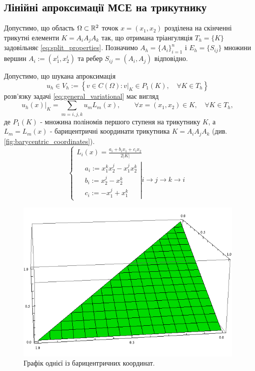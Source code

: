 \subsection{Лінійні апроксимації МСЕ на трикутнику}

Допустимо, що область $\Omega \subset \mathbb{R}^2$ точок $x = (x_1, x_2)$ розділена на скінченні трикутні елементи $K = A_iA_jA_k$
	так, що отримана тріангуляція $T_h = \lbrace K \rbrace$ задовільняє
\eqref{eq:split_properties}.
Позначимо $A_h = \lbrace A_i \rbrace_{i=1}^n$ і $E_h = \lbrace S_{ij} \rbrace$ множини вершин $A_i := (x_1^i, x_2^i)$ та ребер $S_{ij} = (A_i, A_j)$ відповідно.

Допустимо, що шукана апроксимація
\begin{equation}
	u_h \in V_h := \left\lbrace v \in C(\Omega) : v|_K \in P_1(K), \quad \forall K \in T_h \right\rbrace
\end{equation}
%
розв'язку задачі \eqref{eq:general_variational} має вигляд
%
\begin{equation}\label{eq:appr_kind}
	u_h(x)|_K = \sum \limits_{m=i,j,k} u_m L_m (x), \qquad \forall x=(x_1, x_2) \in K, \quad \forall K \in T_h,
\end{equation}
%
де $P_1(K)$ - множина поліномів першого ступеня на трикутнику $K$, а $L_m = L_m(x)$ -
	барицентричні координати трикутника $K = A_i A_j A_k$ (див. \autoref{fig:barycentric_coordinates}).
%
\begin{equation}\label{eq:barycentric_coord}
	\begin{cases}
		L_i(x) = \frac{a_i + b_i x_1 + c_i x_2}{2 |K|} \\
			\left.
			\begin{split}
				&a_i := x_1^k x_2^j - x_1^j x_2^k \\
				&b_i := x_2^j -x_2^k \\
				&c_i := -x_1^j+x_1^k
			\end{split}
			\right|
			i \to j \to k \to i
	\end{cases}
\end{equation}
%
\begin{figure}[H]
	\centering
    \includegraphics[scale=0.5]{images/barycentric}
    \caption{Графік однієї із барицентричних координат.}
    \label{fig:barycentric_coordinates}
\end{figure}
